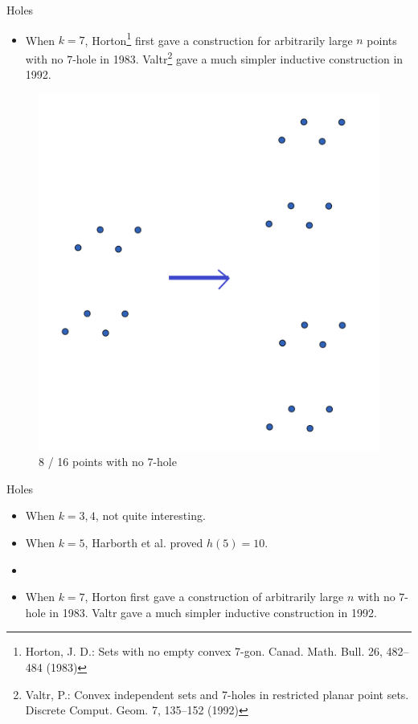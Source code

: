 \documentclass{beamer}
\begin{document}
\begin{frame}{Holes}

	\begin{itemize}

		\item
		      When $k=7$, Horton\footnote{Horton, J. D.: Sets with no empty convex 7-gon. Canad. Math. Bull. 26, 482–484 (1983)} first gave a construction for  arbitrarily large $n$ points with no $7$-hole in 1983. Valtr\footnote{Valtr, P.: Convex independent sets and 7-holes in restricted planar point sets. Discrete Comput.
			      Geom. 7, 135–152 (1992)} gave a much simpler inductive construction  in 1992.
	\end{itemize}

	\begin{figure}
		\centering
		\includegraphics[width=0.5\linewidth]{7hole1.png}
		\caption{8 / 16 points with no 7-hole}

		\label{figh7}
	\end{figure}

\end{frame}

\begin{frame}{Holes}

	\begin{itemize}
		\item
		      When $k=3,4$, not quite interesting.
		\item
		      When $k=5$, Harborth et al. proved $h(5)=10$.
		\item

		\item
		      When $k=7$, Horton first gave a construction of arbitrarily large $n$ with no $7$-hole in 1983. Valtr gave a much simpler inductive construction  in 1992.
	\end{itemize}
\end{frame}
\end{document}
